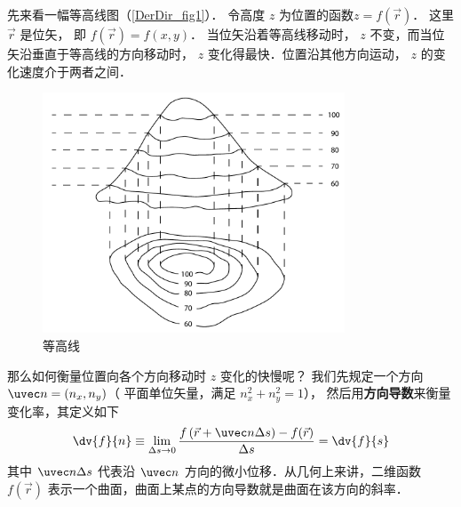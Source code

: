 

先来看一幅等高线图（\autoref{DerDir_fig1}）． 令高度 $z$ 为位置的函数$z = f(\vec r)$． 这里 $\vec r$ 是位矢， 即 $f(\vec r) = f(x,y)$． 当位矢沿着等高线移动时， $z$ 不变，而当位矢沿垂直于等高线的方向移动时， $z$ 变化得最快．位置沿其他方向运动， $z$ 的变化速度介于两者之间．

\begin{figure}[ht]
\centering
\includegraphics[width=9cm]{./figures/DerDir.pdf}
\caption{等高线}\label{DerDir_fig1}
\end{figure}

那么如何衡量位置向各个方向移动时 $z$ 变化的快慢呢？ 我们先规定一个方向 $\uvec n = (n_x,n_y)$（ 平面单位矢量，满足 $n_x^2 + n_y^2 = 1$）， 然后用\textbf{方向导数}来衡量变化率，其定义如下
 \begin{equation}
\dv{f}{n} \equiv \mathop {\lim }\limits_{\Delta s \to 0} \frac{f\left( {\vec r + \uvec n\Delta s} \right) - f(\vec r)}{\Delta s} = \dv{f}{s}
\end{equation}
其中 $\uvec n\Delta s$ 代表沿 $\uvec n$ 方向的微小位移．从几何上来讲，二维函数 $f(\vec r)$ 表示一个曲面，曲面上某点的方向导数就是曲面在该方向的斜率．


